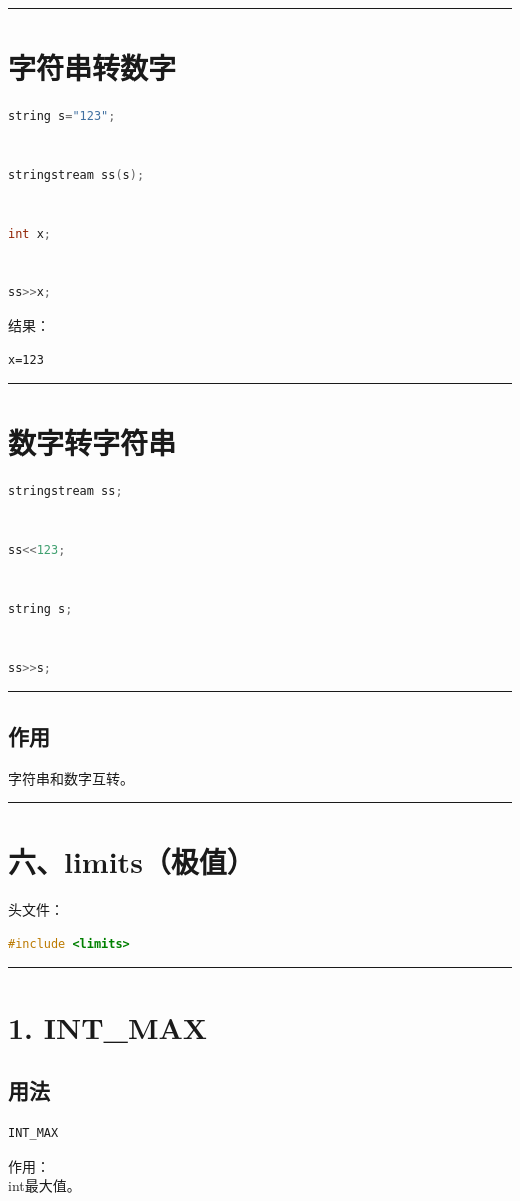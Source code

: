 \documentclass[9pt,twocolumn]{extarticle}
\begin{document}
\noindent\rule{\linewidth}{0.4pt}

\section{字符串转数字}
\begin{lstlisting}[language=C++]
string s="123";


stringstream ss(s);


int x;


ss>>x;
\end{lstlisting}
结果：
\begin{lstlisting}
x=123
\end{lstlisting}

\noindent\rule{\linewidth}{0.4pt}

\section{数字转字符串}
\begin{lstlisting}[language=C++]
stringstream ss;


ss<<123;


string s;


ss>>s;
\end{lstlisting}

\noindent\rule{\linewidth}{0.4pt}

\subsection{作用}
字符串和数字互转。

\noindent\rule{\linewidth}{0.4pt}

\section{六、limits（极值）}

头文件：
\begin{lstlisting}[language=C++]
#include <limits>
\end{lstlisting}

\noindent\rule{\linewidth}{0.4pt}

\section{1. INT\_MAX}

\subsection{用法}
\begin{lstlisting}[language=C++]
INT_MAX
\end{lstlisting}
作用：\\
int最大值。
\end{document}
